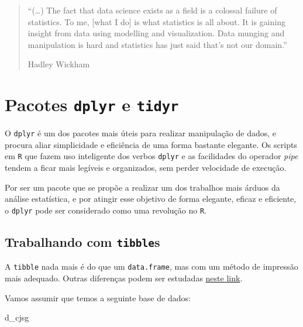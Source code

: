 \documentclass[]{book}
\newenvironment{Shaded}{\begin{snugshade}}{\end{snugshade}}
\newcommand{\NormalTok}[1]{{#1}}
\begin{document}
\begin{quote}
``(\ldots{}) The fact that data science exists as a field is a colossal
failure of statistics. To me, {[}what I do{]} is what statistics is all
about. It is gaining insight from data using modelling and
visualization. Data munging and manipulation is hard and statistics has
just said that's not our domain.''

Hadley Wickham
\end{quote}

\section{\texorpdfstring{Pacotes \texttt{dplyr} e
\texttt{tidyr}}{Pacotes dplyr e tidyr}}\label{pacotes-dplyr-e-tidyr}

O \texttt{dplyr} é um dos pacotes mais úteis para realizar manipulação
de dados, e procura aliar simplicidade e eficiência de uma forma
bastante elegante. Os scripts em \texttt{R} que fazem uso inteligente
dos verbos \texttt{dplyr} e as facilidades do operador \emph{pipe}
tendem a ficar mais legíveis e organizados, sem perder velocidade de
execução.

Por ser um pacote que se propõe a realizar um dos trabalhos mais árduos
da análise estatística, e por atingir esse objetivo de forma elegante,
eficaz e eficiente, o \texttt{dplyr} pode ser considerado como uma
revolução no \texttt{R}.

\subsection{\texorpdfstring{Trabalhando com
\texttt{tibble}s}{Trabalhando com tibbles}}\label{trabalhando-com-tibbles}

A \texttt{tibble} nada mais é do que um \texttt{data.frame}, mas com um
método de impressão mais adequado. Outras diferenças podem ser estudadas
\href{http://r4ds.had.co.nz/tibbles.html}{neste link}.

Vamos assumir que temos a seguinte base de dados:

\begin{Shaded}
\begin{Highlighting}[]
\NormalTok{d_cjsg}
\end{Highlighting}
\end{Shaded}
\end{document}
